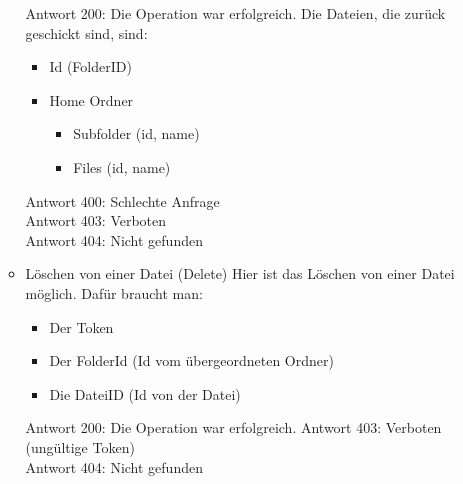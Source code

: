 \begin{enumerate}
\begin{itemize}
Antwort 200: Die Operation war erfolgreich. Die Dateien, die zur\"uck geschickt sind, sind:
\begin{itemize}
\item Id (FolderID)
\item Home Ordner
	\begin{itemize}
	\item Subfolder (id, name)
	\item Files (id, name)
	\end{itemize}
\end{itemize} 
Antwort 400: Schlechte Anfrage \\
Antwort 403: Verboten \\
Antwort 404: Nicht gefunden
\item Löschen von einer Datei (Delete)
Hier ist das L\"oschen von einer Datei m\"oglich. Daf\"ur braucht man: 
\begin{itemize}
\item Der Token
\item Der FolderId (Id vom \"ubergeordneten Ordner)
\item Die DateiID (Id von der Datei)
\end{itemize}
Antwort 200: Die Operation war erfolgreich. 
Antwort 403: Verboten (ung\"ultige Token) \\
Antwort 404: Nicht gefunden
\end{itemize}


\end{enumerate}
